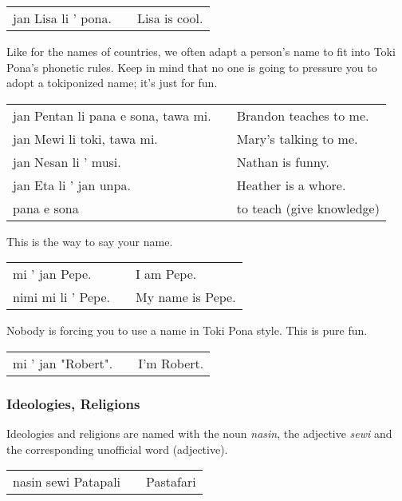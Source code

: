 \begin{supertabular}{p{5,5cm}|ll}
jan Lisa li ' pona. && Lisa is cool. \\
\end{supertabular} 

Like for the names of countries, we often adapt a person's name to fit into Toki Pona's phonetic rules. 
Keep in mind that no one is going to pressure you to adopt a tokiponized name; it's just for fun. 

\begin{supertabular}{p{5,5cm}|ll}
jan Pentan li pana e sona, tawa mi. && Brandon teaches to me. \\
jan Mewi li toki, tawa mi. && Mary's talking to me. \\
jan Nesan li ' musi. && Nathan is funny. \\
jan Eta li ' jan unpa. && Heather is a whore. \\
pana e sona && to teach (give knowledge) \\
\end{supertabular} 

This is the way to say your name. 

\begin{supertabular}{p{5,5cm}|ll}
mi ' jan Pepe. && I am Pepe. \\
nimi mi li ' Pepe. && My name is Pepe. 
\end{supertabular} 

Nobody is forcing you to use a name in Toki Pona style.
This is pure fun.

\begin{supertabular}{p{5,5cm}|ll}
mi ' jan "Robert". && I'm Robert. \\
\end{supertabular} 

%
\subsubsection*{Ideologies, Religions}
%

Ideologies and religions are named with the noun \textit{nasin}, the adjective \textit{sewi} and the corresponding unofficial word (adjective). 

\begin{supertabular}{p{5,5cm}|ll}
nasin sewi Patapali && Pastafari \\
\end{supertabular}

